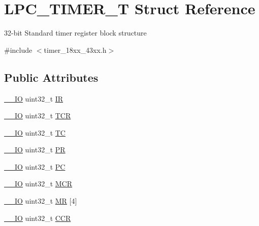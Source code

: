 \hypertarget{struct_l_p_c___t_i_m_e_r___t}{}\section{L\+P\+C\+\_\+\+T\+I\+M\+E\+R\+\_\+T Struct Reference}
\label{struct_l_p_c___t_i_m_e_r___t}


32-\/bit Standard timer register block structure  




{\ttfamily \#include $<$timer\+\_\+18xx\+\_\+43xx.\+h$>$}

\subsection*{Public Attributes}
\begin{DoxyCompactItemize}
\item 
\hyperlink{core__sc300_8h_aec43007d9998a0a0e01faede4133d6be}{\+\_\+\+\_\+\+IO} uint32\+\_\+t \hyperlink{struct_l_p_c___t_i_m_e_r___t_a3db61fe5ab56aeea0c27c6199da63b1a}{IR}
\item 
\hyperlink{core__sc300_8h_aec43007d9998a0a0e01faede4133d6be}{\+\_\+\+\_\+\+IO} uint32\+\_\+t \hyperlink{struct_l_p_c___t_i_m_e_r___t_ab6f7507a9fa9ac19e6ffb35f766027bb}{T\+CR}
\item 
\hyperlink{core__sc300_8h_aec43007d9998a0a0e01faede4133d6be}{\+\_\+\+\_\+\+IO} uint32\+\_\+t \hyperlink{struct_l_p_c___t_i_m_e_r___t_ac92507831988bc15ddc0fbc30ab31bf9}{TC}
\item 
\hyperlink{core__sc300_8h_aec43007d9998a0a0e01faede4133d6be}{\+\_\+\+\_\+\+IO} uint32\+\_\+t \hyperlink{struct_l_p_c___t_i_m_e_r___t_ab803475dcfb9c751b2b8d02f02cb9d95}{PR}
\item 
\hyperlink{core__sc300_8h_aec43007d9998a0a0e01faede4133d6be}{\+\_\+\+\_\+\+IO} uint32\+\_\+t \hyperlink{struct_l_p_c___t_i_m_e_r___t_aff47df94f3c3f882c742af874983ffb9}{PC}
\item 
\hyperlink{core__sc300_8h_aec43007d9998a0a0e01faede4133d6be}{\+\_\+\+\_\+\+IO} uint32\+\_\+t \hyperlink{struct_l_p_c___t_i_m_e_r___t_a7696d9896a932a78d6a6a60488332674}{M\+CR}
\item 
\hyperlink{core__sc300_8h_aec43007d9998a0a0e01faede4133d6be}{\+\_\+\+\_\+\+IO} uint32\+\_\+t \hyperlink{struct_l_p_c___t_i_m_e_r___t_a26e8addd98189542175c5ecbcd8d3776}{MR} \mbox{[}4\mbox{]}
\item 
\hyperlink{core__sc300_8h_aec43007d9998a0a0e01faede4133d6be}{\+\_\+\+\_\+\+IO} uint32\+\_\+t \hyperlink{struct_l_p_c___t_i_m_e_r___t_ae97a68e845ea92e8c617bbdf1d867e48}{C\+CR}

\end{DoxyCompactItemize}
